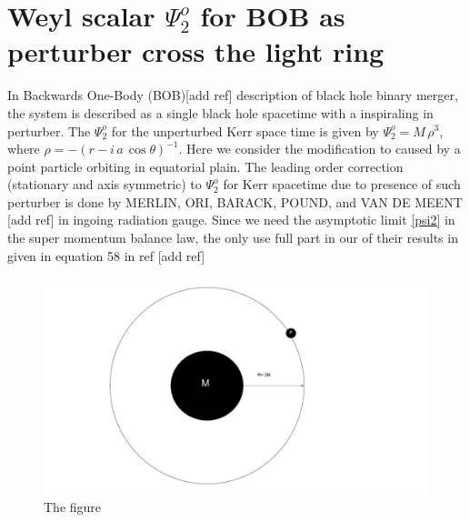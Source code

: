 \documentclass[prd,preprintnumbers,onecolumn,eqsecnum,floatfix,letter]{revtex4}
\begin{document}
\section{ Weyl scalar $\Psi^{o}_{2}$ for BOB as perturber cross the light ring }
In Backwards One-Body (BOB)[add ref] description of black hole binary merger, the system is described as a single black hole spacetime with a inspiraling in perturber. The $\Psi^{o}_{2}$ for the unperturbed Kerr space time is given by $\Psi^{o}_{2} = M\,\rho^{3}$, where $\rho = - (r - i\,a\, \cos\theta)^{-1}$. Here we consider the modification to caused by a point particle orbiting in equatorial plain. The leading order correction (stationary and axis symmetric) to $\Psi^{o}_{2}$ for Kerr spacetime due to presence of such perturber  is done by MERLIN, ORI, BARACK, POUND, and VAN DE MEENT [add ref] in ingoing radiation gauge. Since we need the asymptotic limit \ref{psi2} in the super momentum balance law, the only use full part in our of their results in given in equation 58 in ref [add ref]    
\begin{figure}
	\includegraphics[width=5.5in]{../plots/BOB.pdf}
	\caption{The figure}
	\label{fig:resedualGrowthLogLog}
\end{figure} 
\end{document}
